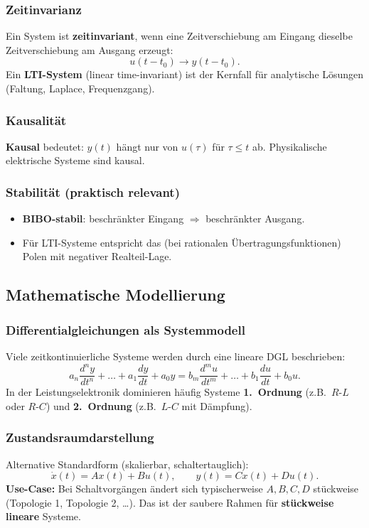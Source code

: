 \subsubsection{Zeitinvarianz}
Ein System ist \textbf{zeitinvariant}, wenn eine Zeitverschiebung am Eingang dieselbe Zeitverschiebung am Ausgang erzeugt:
\[
u(t-t_0)\rightarrow y(t-t_0).
\]
Ein \textbf{LTI-System} (linear time-invariant) ist der Kernfall für analytische Lösungen (Faltung, Laplace, Frequenzgang).

\subsubsection{Kausalität}
\textbf{Kausal} bedeutet: $y(t)$ hängt nur von $u(\tau)$ für $\tau \le t$ ab.
Physikalische elektrische Systeme sind kausal.

\subsubsection{Stabilität (praktisch relevant)}
\begin{itemize}
    \item \textbf{BIBO-stabil}: beschränkter Eingang $\Rightarrow$ beschränkter Ausgang.
    \item Für LTI-Systeme entspricht das (bei rationalen Übertragungsfunktionen) Polen mit negativer Realteil-Lage.
\end{itemize}

\subsection{Mathematische Modellierung}

\subsubsection{Differentialgleichungen als Systemmodell}
Viele zeitkontinuierliche Systeme werden durch eine lineare DGL beschrieben:
\[
a_n \frac{d^n y}{dt^n} + \dots + a_1 \frac{dy}{dt} + a_0 y
=
b_m \frac{d^m u}{dt^m} + \dots + b_1 \frac{du}{dt} + b_0 u.
\]
In der Leistungselektronik dominieren häufig Systeme \textbf{1.\ Ordnung} (z.B.\ $R$-$L$ oder $R$-$C$) und \textbf{2.\ Ordnung} (z.B.\ $L$-$C$ mit Dämpfung).

\subsubsection{Zustandsraumdarstellung}
Alternative Standardform (skalierbar, schaltertauglich):
\[
\dot{x}(t)=A x(t)+B u(t), \qquad y(t)=C x(t)+D u(t).
\]
\textbf{Use-Case:} Bei Schaltvorgängen ändert sich typischerweise $A,B,C,D$ stückweise (Topologie 1, Topologie 2, \dots).
Das ist der saubere Rahmen für \textbf{stückweise lineare} Systeme.

